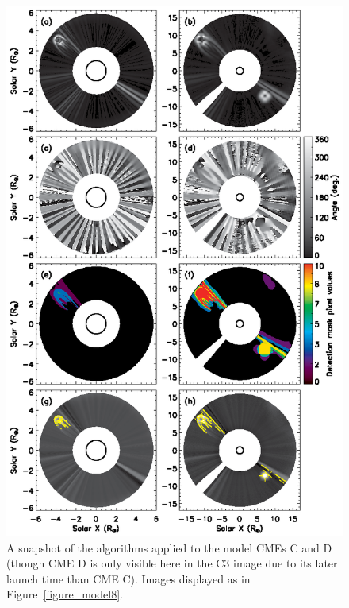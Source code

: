\documentclass[preprint2]{aastex}
\begin{document}
\begin{figure}[!t]
\centerline{\includegraphics[scale=0.78, clip=true, trim=0 0 0 0]{figure_model8_2.eps}}
\caption{A snapshot of the algorithms applied to the model CMEs C and D (though CME D is only visible here in the C3 image due to its later launch time than CME C). Images displayed as in Figure~\ref{figure_model8}.}
\label{figure_model8_2}
\end{figure}
\end{document}
